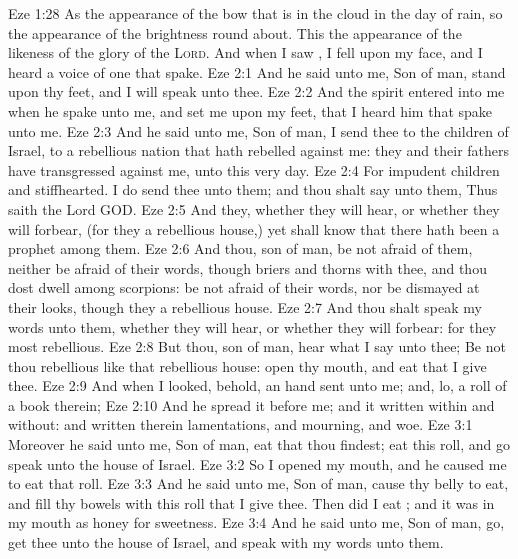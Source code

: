 \vs Eze 1:28 As the appearance of the bow that is in the cloud in the day of rain, so  the appearance of the brightness round about. This  the appearance of the likeness of the glory of the \textsc{Lord}. And when I saw , I fell upon my face, and I heard a voice of one that spake.
\vs Eze 2:1 And he said unto me, Son of man, stand upon thy feet, and I will speak unto thee.
\vs Eze 2:2 And the spirit entered into me when he spake unto me, and set me upon my feet, that I heard him that spake unto me.
\vs Eze 2:3 And he said unto me, Son of man, I send thee to the children of Israel, to a rebellious nation that hath rebelled against me: they and their fathers have transgressed against me,  unto this very day.
\vs Eze 2:4 For  impudent children and stiffhearted. I do send thee unto them; and thou shalt say unto them, Thus saith the Lord GOD.
\vs Eze 2:5 And they, whether they will hear, or whether they will forbear, (for they  a rebellious house,) yet shall know that there hath been a prophet among them.
\vs Eze 2:6 And thou, son of man, be not afraid of them, neither be afraid of their words, though briers and thorns  with thee, and thou dost dwell among scorpions: be not afraid of their words, nor be dismayed at their looks, though they  a rebellious house.
\vs Eze 2:7 And thou shalt speak my words unto them, whether they will hear, or whether they will forbear: for they  most rebellious.
\vs Eze 2:8 But thou, son of man, hear what I say unto thee; Be not thou rebellious like that rebellious house: open thy mouth, and eat that I give thee.
\vs Eze 2:9 And when I looked, behold, an hand  sent unto me; and, lo, a roll of a book  therein;
\vs Eze 2:10 And he spread it before me; and it  written within and without: and  written therein lamentations, and mourning, and woe.
\vs Eze 3:1 Moreover he said unto me, Son of man, eat that thou findest; eat this roll, and go speak unto the house of Israel.
\vs Eze 3:2 So I opened my mouth, and he caused me to eat that roll.
\vs Eze 3:3 And he said unto me, Son of man, cause thy belly to eat, and fill thy bowels with this roll that I give thee. Then did I eat ; and it was in my mouth as honey for sweetness.
\vs Eze 3:4 And he said unto me, Son of man, go, get thee unto the house of Israel, and speak with my words unto them.
